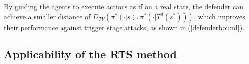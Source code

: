 \documentclass[letterpaper, 10 pt, conference]{ieeeconf}  %
\begin{document}
By guiding the agents to execute actions as if on a real state, the defender can achieve a smaller distance of $D_{TV}(\pi^*(\cdot| s), \pi^*(\cdot| T^d(s^*)))$, which improves their performance against trigger stage attacks, as shown in (\ref{defenderbound}).



\iffalse
The problem also relates to the vulnerability of the neural networks, that the neural networks can generate distinct output with tiny disturbance on the input. Thus, one way to improve the model's inference task performance is to reduce the vulnerability of neural networks as shown in (\ref{randomindynamics}).
\begin{equation}
\label{randomindynamics}
S_{t+1}=f\left(s_t, a_t\right)+\omega\left(s_t\right)+\omega(f)
\end{equation}

In Equation (\ref{randomindynamics}), 
This equation shows why the dual-objective dynamics model performs better than the single-objective dynamics model, because the former can give a predicted state on which the policy will execute action. 
\fi

\iffalse
\subsection{Applicability of the RTS method}
\end{document}
